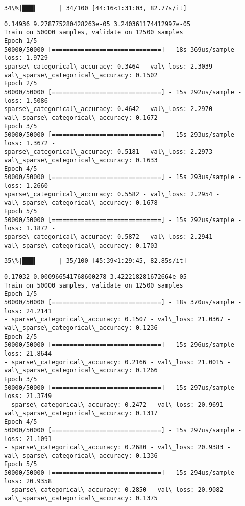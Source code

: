 \documentclass[11pt]{article}
\begin{document}
    \begin{Verbatim}[commandchars=\\\{\}]
 34\%|███▍      | 34/100 [44:16<1:31:03, 82.77s/it]
    \end{Verbatim}

    \begin{Verbatim}[commandchars=\\\{\}]
0.14936 9.278775280428263e-05 3.240361174412997e-05
Train on 50000 samples, validate on 12500 samples
Epoch 1/5
50000/50000 [==============================] - 18s 369us/sample - loss: 1.9729 -
sparse\_categorical\_accuracy: 0.3464 - val\_loss: 2.3039 -
val\_sparse\_categorical\_accuracy: 0.1502
Epoch 2/5
50000/50000 [==============================] - 15s 292us/sample - loss: 1.5086 -
sparse\_categorical\_accuracy: 0.4642 - val\_loss: 2.2970 -
val\_sparse\_categorical\_accuracy: 0.1672
Epoch 3/5
50000/50000 [==============================] - 15s 293us/sample - loss: 1.3672 -
sparse\_categorical\_accuracy: 0.5181 - val\_loss: 2.2973 -
val\_sparse\_categorical\_accuracy: 0.1633
Epoch 4/5
50000/50000 [==============================] - 15s 293us/sample - loss: 1.2660 -
sparse\_categorical\_accuracy: 0.5582 - val\_loss: 2.2954 -
val\_sparse\_categorical\_accuracy: 0.1678
Epoch 5/5
50000/50000 [==============================] - 15s 292us/sample - loss: 1.1872 -
sparse\_categorical\_accuracy: 0.5872 - val\_loss: 2.2941 -
val\_sparse\_categorical\_accuracy: 0.1703
    \end{Verbatim}

    \begin{Verbatim}[commandchars=\\\{\}]
 35\%|███▌      | 35/100 [45:39<1:29:45, 82.85s/it]
    \end{Verbatim}

    \begin{Verbatim}[commandchars=\\\{\}]
0.17032 0.000966541768600278 3.422218281672664e-05
Train on 50000 samples, validate on 12500 samples
Epoch 1/5
50000/50000 [==============================] - 18s 370us/sample - loss: 24.2141
- sparse\_categorical\_accuracy: 0.1507 - val\_loss: 21.0367 -
val\_sparse\_categorical\_accuracy: 0.1236
Epoch 2/5
50000/50000 [==============================] - 15s 296us/sample - loss: 21.8644
- sparse\_categorical\_accuracy: 0.2166 - val\_loss: 21.0015 -
val\_sparse\_categorical\_accuracy: 0.1266
Epoch 3/5
50000/50000 [==============================] - 15s 297us/sample - loss: 21.3749
- sparse\_categorical\_accuracy: 0.2472 - val\_loss: 20.9691 -
val\_sparse\_categorical\_accuracy: 0.1317
Epoch 4/5
50000/50000 [==============================] - 15s 297us/sample - loss: 21.1091
- sparse\_categorical\_accuracy: 0.2680 - val\_loss: 20.9383 -
val\_sparse\_categorical\_accuracy: 0.1336
Epoch 5/5
50000/50000 [==============================] - 15s 294us/sample - loss: 20.9358
- sparse\_categorical\_accuracy: 0.2850 - val\_loss: 20.9082 -
val\_sparse\_categorical\_accuracy: 0.1375
    \end{Verbatim}
\end{document}

